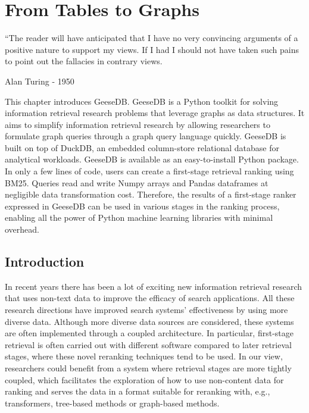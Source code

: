 \chapter{From Tables to Graphs}
\label{from-tables-to-graphs}
\epigraph{``The reader will have anticipated that I have no very convincing
	arguments of a positive nature to support my views. If I had I should not
	have taken such pains to point out the fallacies in contrary views.}{Alan Turing - 1950}

\begin{Abstract}
	\begin{changemargin}{1cm}{1cm}
		This chapter introduces GeeseDB. GeeseDB is a Python toolkit for solving information retrieval research problems that leverage graphs as data structures. It aims to simplify information retrieval research by allowing researchers to formulate graph queries through a graph query language quickly. GeeseDB is built on top of DuckDB, an embedded column-store relational database for analytical workloads. GeeseDB is available as an easy-to-install Python package. In only a few lines of code, users can create a first-stage retrieval ranking using BM25. Queries read and write Numpy arrays and Pandas dataframes at negligible data transformation cost. Therefore, the results of a first-stage ranker expressed in GeeseDB can be used in various stages in the ranking process, enabling all the power of Python machine learning libraries with minimal overhead.
	\end{changemargin}
\end{Abstract}

\section{Introduction}
In recent years there has been a lot of exciting new information retrieval research that uses non-text data to improve the efficacy of search applications. All these research directions have improved search systems' effectiveness by using more diverse data. Although more diverse data sources are considered, these systems are often implemented through a coupled architecture. In particular, first-stage retrieval is often carried out with different software compared to later retrieval stages, where these novel reranking techniques tend to be used. In our view, researchers could benefit from a system where retrieval stages are more tightly coupled, which facilitates the exploration of how to use non-content data for ranking and serves the data in a format suitable for reranking with, e.g., transformers, tree-based methods or graph-based methods.

